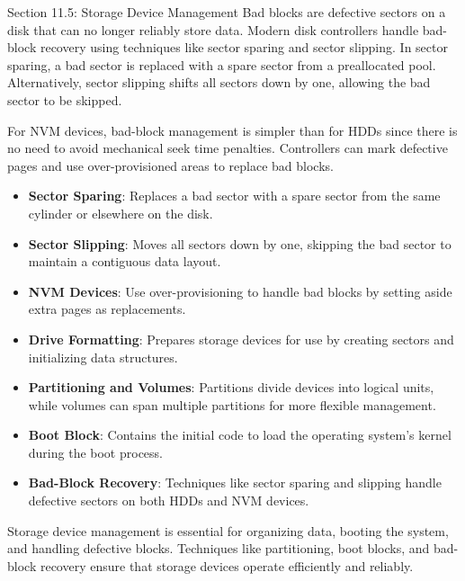 \begin{notes}{Section 11.5: Storage Device Management}
    Bad blocks are defective sectors on a disk that can no longer reliably store data. Modern disk controllers handle bad-block recovery using techniques like sector sparing and sector slipping. In sector 
    sparing, a bad sector is replaced with a spare sector from a preallocated pool. Alternatively, sector slipping shifts all sectors down by one, allowing the bad sector to be skipped.
    
    For NVM devices, bad-block management is simpler than for HDDs since there is no need to avoid mechanical seek time penalties. Controllers can mark defective pages and use over-provisioned areas 
    to replace bad blocks.

    \begin{highlight}
    
        \begin{itemize}
            \item \textbf{Sector Sparing}: Replaces a bad sector with a spare sector from the same cylinder or elsewhere on the disk.
            \item \textbf{Sector Slipping}: Moves all sectors down by one, skipping the bad sector to maintain a contiguous data layout.
            \item \textbf{NVM Devices}: Use over-provisioning to handle bad blocks by setting aside extra pages as replacements.
        \end{itemize}
    
    \end{highlight}
    
    \begin{highlight}
    
        \begin{itemize}
            \item \textbf{Drive Formatting}: Prepares storage devices for use by creating sectors and initializing data structures.
            \item \textbf{Partitioning and Volumes}: Partitions divide devices into logical units, while volumes can span multiple partitions for more flexible management.
            \item \textbf{Boot Block}: Contains the initial code to load the operating system's kernel during the boot process.
            \item \textbf{Bad-Block Recovery}: Techniques like sector sparing and slipping handle defective sectors on both HDDs and NVM devices.
        \end{itemize}
    
    Storage device management is essential for organizing data, booting the system, and handling defective blocks. Techniques like partitioning, boot blocks, and bad-block recovery ensure that storage 
    devices operate efficiently and reliably.
    
    \end{highlight}

\end{notes}


